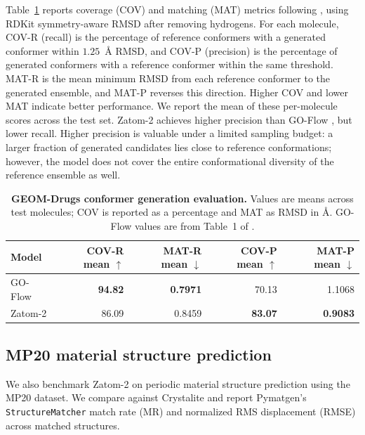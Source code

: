\documentclass{article} %
\begin{document}
Table~\ref{tab:geom-drugs-zatom2-structure} reports coverage (COV) and matching
(MAT) metrics following \citet{liu2026goflow}, using RDKit symmetry-aware RMSD after removing hydrogens. For each molecule, COV-R (recall) is
the percentage of reference conformers with a generated conformer within
$1.25$~\AA{} RMSD, and COV-P (precision) is the percentage of generated conformers
with a reference conformer within the same threshold. MAT-R is the mean minimum
RMSD from each reference conformer to the generated ensemble, and MAT-P reverses
this direction. Higher COV and lower MAT indicate better performance. We report
the mean of these per-molecule scores across the test set. Zatom-2 achieves higher precision than
GO-Flow \citep{liu2026goflow}, but lower recall. Higher precision is
valuable under a limited sampling budget: a larger fraction of generated
candidates lies close to reference conformations; however, the model does not cover the entire conformational diversity of the reference ensemble as well.

  \begin{table}[!htbp]
    \centering
    \small
    \caption{\textbf{GEOM-Drugs conformer generation evaluation.}
    Values are means across test molecules; COV is reported as a percentage
    and MAT as RMSD in \AA. GO-Flow values are
    from Table~1 of \citet{liu2026goflow}.}
    \label{tab:geom-drugs-zatom2-structure}
    \vspace{0.4em}
    \begin{tabular}{@{}lrrrr@{}}
      \toprule
      Model & COV-R mean $\uparrow$ & MAT-R mean $\downarrow$
      & COV-P mean $\uparrow$ & MAT-P mean $\downarrow$ \\
      \midrule
      GO-Flow & \textbf{94.82} & \textbf{0.7971} & 70.13 & 1.1068 \\
      Zatom-2 & 86.09 & 0.8459 & \textbf{83.07} & \textbf{0.9083} \\
      \bottomrule
    \end{tabular}
  \end{table}
\FloatBarrier

\subsection{MP20 material structure prediction}
\label{app:mp20-material-structure-prediction}

We also benchmark Zatom-2 on periodic material structure prediction using the MP20 dataset. We compare against Crystalite \citep{hadziveljkovic2026crystalite} and report
Pymatgen's \texttt{StructureMatcher} match rate (MR) and normalized RMS displacement (RMSE) \citep{ong2013pymatgen} across matched structures. 
\end{document}
